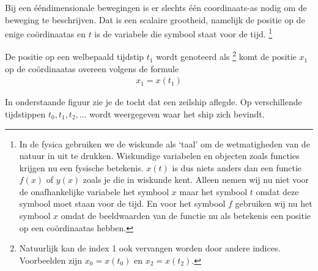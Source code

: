 \documentclass{ximera}
\begin{document}
Bij een ééndimensionale bewegingen is er slechts één coordinaats-as nodig om de beweging te beschrijven. 
Dat is een scalaire grootheid, namelijk de positie op de enige coördinaatas
en $t$ is de variabele die symbool staat voor de tijd.
\footnote{In de fysica gebruiken we de wiskunde als `taal' om de wetmatigheden van de natuur in uit te drukken. 
Wiskundige variabelen en objecten zoals functies krijgen nu een fysische betekenis. 
$x(t)$ is dus niets anders dan een functie $f(x)$ of $y(x)$ zoals je die in wiskunde kent. 
Alleen nemen wij nu niet voor de onafhankelijke variabele het symbool $x$ maar het symbool $t$ omdat deze symbool moet staan voor de tijd. 
En voor het symbool $f$ gebruiken wij nu het symbool $x$ omdat de beeldwaarden van de functie nu als betekenis een positie op een coördinaatas hebben.}


De positie op een welbepaald tijdstip $t_1$ wordt genoteerd als 
\footnote{Natuurlijk kan de index 1 ook vervangen worden door andere indices. Voorbeelden zijn $x_0=x(t_0)$ en $x_2=x(t_2)$.} komt de positie $x_1$ op de coördinaatas overeen volgens de formule
\begin{eqnarray*}
x_1=x(t_1)
\end{eqnarray*}

In onderstaande figuur zie je de tocht dat een zeilship aflegde. 
Op verschillende tijdstippen $t_0,t_1, t_2,\ldots$ wordt weergegeven waar het ship zich bevindt. 


\end{document}

